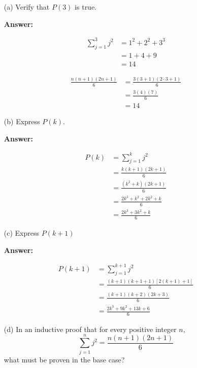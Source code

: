 \documentclass[14pt]{extreport}
\newcommand{\answer}[0]{\medskip \textbf{Answer:} \medskip}
\begin{document}
\begin{enumerate}
    
    \item[(a)] Verify that \( P(3) \) is true.
    
        \answer

        \begin{align*}
            \sum_{j=1}^3 j^2 &= 1^2 + 2^2 + 3^3 \\
                         &= 1 + 4 + 9 \\
                         &= 14
        \end{align*}

        \begin{align*}
            \frac{n(n + 1)(2n + 1)}{6} &= \frac{3(3 + 1)(2 \cdot 3 + 1)}{6} \\
                                       &= \frac{3(4)(7)}{6} \\
                                       &= 14
        \end{align*}
        
    \item[(b)] Express \( P(k) \).
    
        \answer

        \begin{align*}
            P(k) &= \sum_{j=1}^k j^2 \\
                 &= \frac{k(k + 1)(2k + 1)}{6} \\
                 &= \frac{(k^2 + k)(2k + 1)}{6} \\
                 &= \frac{2k^3 + k^2 + 2k^2 + k}{6} \\
                 &= \frac{2k^3 + 3k^2 + k}{6}
        \end{align*}

    \item[(c)] Express \( P(k + 1) \)
    
        \answer

        \begin{align*}
            P(k + 1) &= \sum_{j=1}^{k + 1} j^2 \\
                 &= \frac{(k + 1)(k + 1 + 1)[2(k + 1) + 1]}{6} \\
                 &= \frac{(k + 1)(k + 2)(2k + 3)}{6} \\
                 &= \frac{2k^3 + 9k^2 + 13k + 6}{6}         
        \end{align*}

    \item[(d)] In an inductive proof that for every positive integer \( n \), 
    \[
        \sum_{j=1}^n j^2 = \frac{n(n + 1)(2n + 1)}{6}
    \] 
    what must be proven in the base case?


\end{enumerate}
\end{document}
